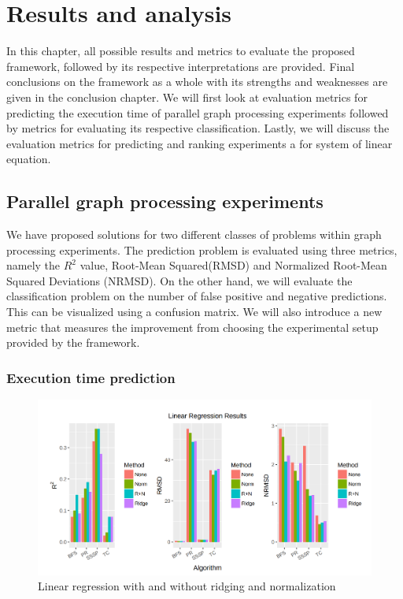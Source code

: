 
\chapter{Results and analysis} 
In this chapter, all possible results and metrics to evaluate the proposed framework, followed by its respective interpretations are provided. Final conclusions on the framework as a whole with its strengths and weaknesses are given in the conclusion chapter.  We will first look at evaluation metrics for predicting the execution time of parallel graph processing experiments followed by metrics for evaluating its respective classification. Lastly, we will discuss the evaluation metrics for predicting and ranking experiments a for system of linear equation. 
\section{Parallel graph processing experiments}
We have proposed solutions for two different classes of problems within graph processing experiments. The prediction problem is evaluated using three metrics, namely the $R^2$ value, Root-Mean Squared(RMSD) and Normalized Root-Mean Squared Deviations (NRMSD).
On the other hand, we will evaluate the classification problem on the number of false positive and negative predictions. This can be visualized using a confusion matrix. We will also introduce a new metric that measures the improvement from choosing the experimental setup provided by the framework.

\subsection{Execution time prediction}

\begin{figure}
    \centering
    \includegraphics[width=1\columnwidth]{figures/regression_results.png}
    \caption{Linear regression with and without ridging and normalization}
    \label{Linear regression with and without ridging and normalization}
\end{figure}

